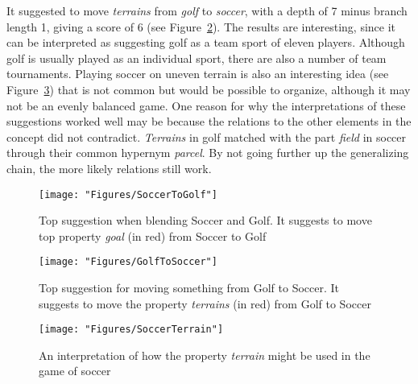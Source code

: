 It suggested to move \emph{terrains} from \emph{golf} to \emph{soccer}, with a depth of 7 minus branch length 1, giving a score of 6 (see Figure~\ref{ GolfToSoccer }). The results are interesting, since it can be interpreted as suggesting golf as a team sport of eleven players. Although golf is usually played as an individual sport, there are also a number of team tournaments. Playing soccer on uneven terrain is also an interesting idea (see Figure~\ref{ SoccerTerrain }) that is not common but would be possible to organize, although it may not be an evenly balanced game. One reason for why the interpretations of these suggestions worked well may be because the relations to the other elements in the concept did not contradict. \emph{Terrains} in golf matched with the part \emph{field} in soccer through their common hypernym \emph{parcel}. By not going further up the generalizing chain, the more likely relations still work.

\begin{figure} \centering \texttt{[image: "Figures/SoccerToGolf"]} \caption{Top suggestion when blending Soccer and Golf. It suggests to move top property \emph{goal} (in red) from Soccer to Golf } \label{ SoccerToGolf } \end{figure}

\begin{figure} \centering \texttt{[image: "Figures/GolfToSoccer"]} \caption{Top suggestion for moving something from Golf to Soccer. It suggests to move the property \emph{terrains} (in red) from Golf to Soccer } \label{ GolfToSoccer } \end{figure}

\begin{figure} \centering \texttt{[image: "Figures/SoccerTerrain"]} \caption{An interpretation of how the property \emph{terrain} might be used in the game of soccer} \label{ SoccerTerrain } \end{figure}



